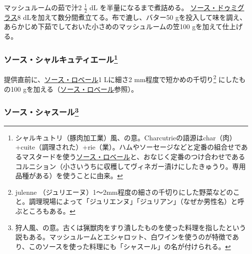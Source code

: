 \begin{recette}
マッシュルームの茹で汁2 \(\frac{1}{2}\) dL を半量になるまで煮詰める。
\protect\hyperlink{sauce-demi-glace}{ソース・ドゥミグラス}8
dLを加えて数分間煮立てる。布で漉し、バター50
gを投入して味を調え、あらかじめ下茹でしておいた小さめのマッシュルームの笠100
gを加えて仕上げる。

\hypertarget{sauce-charcutiere}{%
\subsubsection[ソース・シャルキュティエール]{\texorpdfstring{ソース・シャルキュティエール\footnote{シャルキュトリ（豚肉加工業）風、の意。Charcutrieの語源はchar（肉）
  +cuite（調理された）+rie（業）。ハムやソーセージなどと定番の組合せであるマスタードを使う\protect\hyperlink{sauce-robert}{ソース・ロベール}と、おなじく定番のつけ合わせであるコルニション（小さいうちに収穫してヴィネガー漬けにしたきゅうり。専用品種がある）を使うことに由来。}}{ソース・シャルキュティエール}}\label{sauce-charcutiere}}



提供直前に、\protect\hyperlink{sauce-robert}{ソース・ロベール}1 Lに細さ2
mm程度で短かめの千切り\footnote{julenne
  （ジュリエーヌ）1〜2mm程度の細さの千切りにした野菜などのこと。調理現場によって「ジュリエンヌ」「ジュリアン」（なぜか男性名）と呼ぶところもある。}
にしたもの100
gを加える（\protect\hyperlink{sauce-robert}{ソース・ロベール}参照）。

\hypertarget{sauce-chasseur}{%
\subsubsection[ソース・シャスール]{\texorpdfstring{ソース・シャスール\footnote{狩人風、の意。古くは猟獣肉をすり潰したものを使った料理を指したという説もある。マッシュルームとエシャロット、白ワインを使うのが特徴であり、このソースを使った料理にも「シャスール」の名が付けられる。}}{ソース・シャスール}}\label{sauce-chasseur}}




\end{recette}
